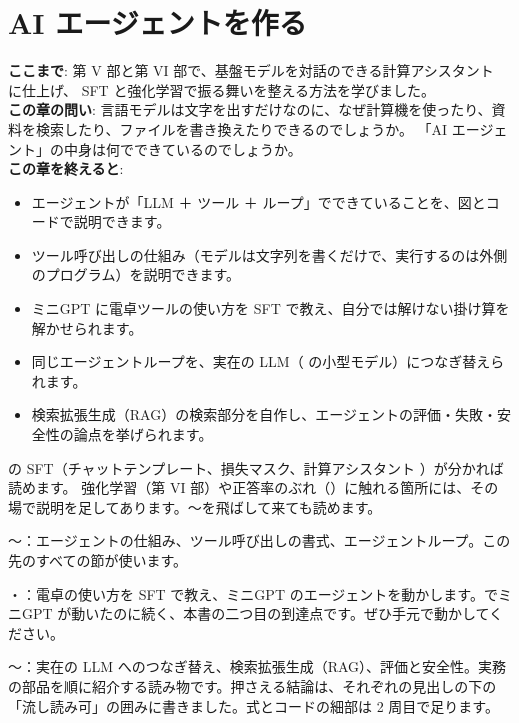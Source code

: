 \chapter{AI エージェントを作る}\label{ch:agent}

\begin{chapterlead}
\textbf{ここまで}: 第 V 部と第 VI 部で、基盤モデルを対話のできる計算アシスタント  に仕上げ、
SFT と強化学習で振る舞いを整える方法を学びました。\\
\textbf{この章の問い}: 言語モデルは文字を出すだけなのに、なぜ計算機を使ったり、資料を検索したり、ファイルを書き換えたりできるのでしょうか。
「AI エージェント」の中身は何でできているのでしょうか。\\[1mm]
\textbf{この章を終えると}:
\begin{itemize}
\item エージェントが「LLM ＋ ツール ＋ ループ」でできていることを、図とコードで説明できます。
\item ツール呼び出しの仕組み（モデルは文字列を書くだけで、実行するのは外側のプログラム）を説明できます。
\item ミニGPT に電卓ツールの使い方を SFT で教え、自分では解けない掛け算を解かせられます。
\item 同じエージェントループを、実在の LLM（ の小型モデル）につなぎ替えられます。
\item 検索拡張生成（RAG）の検索部分を自作し、エージェントの評価・失敗・安全性の論点を挙げられます。
\end{itemize}
\end{chapterlead}

\begin{readingguide}
\item[\rgpre] の SFT（チャットテンプレート、損失マスク、計算アシスタント ）が分かれば読めます。
強化学習（第 VI 部）や正答率のぶれ（）に触れる箇所には、その場で説明を足してあります。〜を飛ばして来ても読めます。
\item[\rgmust] 〜：エージェントの仕組み、ツール呼び出しの書式、エージェントループ。この先のすべての節が使います。
\item[\rgmust] ・：電卓の使い方を SFT で教え、ミニGPT のエージェントを動かします。でミニGPT が動いたのに続く、本書の二つ目の到達点です。ぜひ手元で動かしてください。
\item[\rgskim] 〜：実在の LLM へのつなぎ替え、検索拡張生成（RAG）、評価と安全性。実務の部品を順に紹介する読み物です。押さえる結論は、それぞれの見出しの下の「流し読み可」の囲みに書きました。式とコードの細部は 2 周目で足ります。
\end{readingguide}

